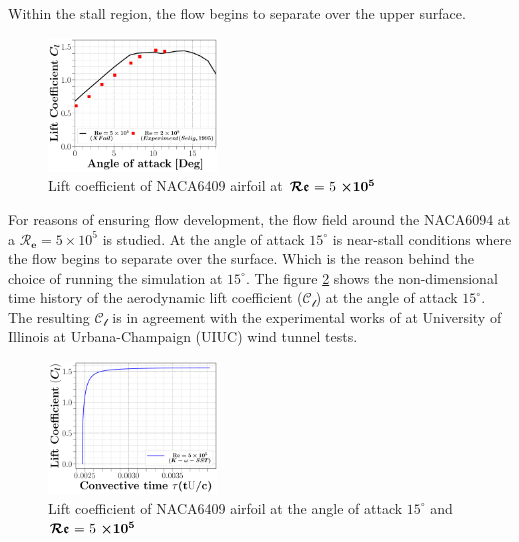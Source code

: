 \documentclass[conf]{new-aiaa}
\newcommand{\Rey}{\mathcal{R}\mathfrak{e}}
\begin{document}
%
Within the stall region, the flow begins to separate over the upper surface. 
\begin{figure}[ht!]
\centering
\includegraphics[width=0.4\textwidth]{figs/liftCoeff.pdf}
\caption{Lift coefficient of NACA6409 airfoil at $\boldsymbol{\Rey$ = 5 $\times 10^5}$}
\label{fig:lfitCoe} 
\end{figure}

For reasons of ensuring flow development, the flow field around the NACA6094 at a $\mathcal{R_{\mathbf{e}}} = 5 \times 10 ^5$ is studied.
%
At the angle of attack $15^{\circ}$ is near-stall conditions where the flow begins to separate over the surface.
%
Which is the reason behind the choice of running the simulation at $15^{\circ}$.
%
The figure \ref{fig:lfitCoe} shows the non-dimensional time history of the aerodynamic lift coefficient ($\mathcal{C}_{\mathscr{l}}$) at the angle of attack $15^{\circ}$.
%
The resulting $\mathcal{C}_{\mathscr{l}}$ is in agreement with the experimental works of \citet{Selig1995} at University of Illinois at Urbana-Champaign (UIUC) wind tunnel tests.


\begin{figure}[ht!]
\centering
\includegraphics[width=0.4\textwidth]{figs/LiftCoeAngle15.pdf}
\caption{Lift coefficient of NACA6409 airfoil at the angle of attack $15^{\circ}$ and $\boldsymbol{\Rey$ = 5 $\times 10^5}$}
\label{fig:lfitCoe} 
\end{figure}
%
\end{document}
